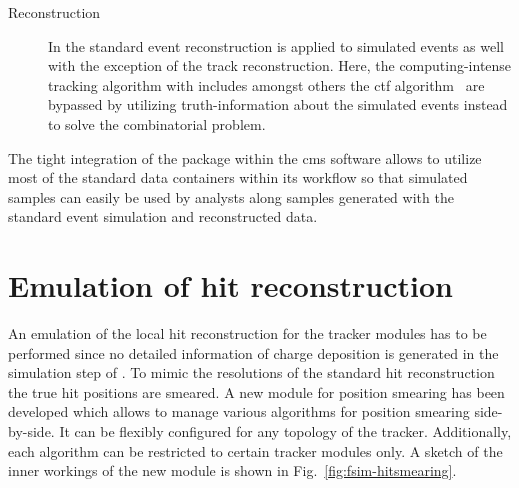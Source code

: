 \begin{description}
\item[Reconstruction] In \FSIM the standard event reconstruction is applied to simulated events as well with the exception of the track reconstruction. Here, the computing-intense tracking algorithm with includes amongst others the \acrfull{ctf} algorithm~\cite{Chatrchyan:2014fea} are bypassed by utilizing truth-information about the simulated events instead to solve the combinatorial problem.
\end{description}

The tight integration of the \FSIM package within the \gls{cms} software allows to utilize most of the standard data containers within its workflow so that simulated \FSIM samples can easily be used by analysts along samples generated with the standard event simulation and reconstructed data. 


\section{Emulation of hit reconstruction}
\label{sec:fsim-hits}

An emulation of the local hit reconstruction for the tracker modules has to be performed since no detailed information of charge deposition is generated in the simulation step of \FSIM. To mimic the resolutions of the standard hit reconstruction the true hit positions are smeared. A new \FSIM module for position smearing has been developed which allows to manage various algorithms for position smearing side-by-side. It can be flexibly configured for any topology of the tracker. Additionally, each algorithm can be restricted to certain tracker modules only. A sketch of the inner workings of the new module is shown in Fig.~\ref{fig:fsim-hitsmearing}.


